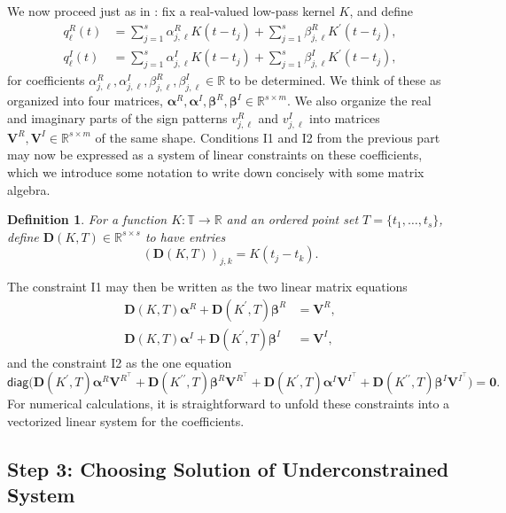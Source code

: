 \documentclass[11pt]{article}
\newcommand{\RR}{\mathbb{R}}
\newcommand{\TT}{\mathbb{T}}
\newcommand{\diag}{\mathsf{diag}}
\newcommand{\balpha}{\bm \alpha}
\newcommand{\bbeta}{\bm \beta}
\newcommand{\bD}{\bm D}
\newcommand{\bV}{\bm V}
\newtheorem{definition}{Definition}
\begin{document}
We now proceed just as in \cite{fernandez2016super}: fix a real-valued low-pass kernel $K$, and define
\begin{align}
  q_\ell^R(t) &= \sum_{j = 1}^s \alpha_{j, \ell}^R K(t - t_j) + \sum_{j = 1}^s \beta_{j, \ell}^R K^\prime(t - t_j), \label{eq:interpolant-def-1} \\
  q_\ell^I(t) &= \sum_{j = 1}^s \alpha_{j, \ell}^I K(t - t_j) + \sum_{j = 1}^s \beta_{j, \ell}^I K^\prime(t - t_j), \label{eq:interpolant-def-2}
\end{align}
for coefficients $\alpha_{j, \ell}^R, \alpha_{j, \ell}^I, \beta_{j, \ell}^R, \beta_{j, \ell}^I \in \RR$ to be determined.
We think of these as organized into four matrices, $\balpha^R, \balpha^I, \bbeta^R, \bbeta^I \in \RR^{s \times m}$.
We also organize the real and imaginary parts of the sign patterns $v_{j, \ell}^R$ and $v_{j, \ell}^I$ into matrices $\bV^R, \bV^I \in \RR^{s \times m}$ of the same shape.
Conditions I1 and I2 from the previous part may now be expressed as a system of linear constraints on these coefficients, which we introduce some notation to write down concisely with some matrix algebra.
\begin{definition}
    For a function $K: \TT \to \RR$ and an ordered point set $T = \{t_1, \dots, t_s\}$, define $\bD(K, T) \in \RR^{s \times s}$ to have entries
    \begin{equation}
        (\bD(K, T))_{j, k} = K(t_j - t_k).
    \end{equation}
\end{definition}
The constraint I1 may then be written as the two linear matrix equations
\begin{align}
  \bD(K, T)\balpha^R + \bD(K^\prime, T)\bbeta^R &= \bV^R, \label{1045} \\
  \bD(K, T)\balpha^I + \bD(K^\prime, T)\bbeta^I &= \bV^I, \label{1046}
\end{align}
and the constraint I2 as the one equation
\begin{equation}
    \diag\bigg(\bD(K^{\prime}, T)\balpha^R\bV^{R^\top} + \bD(K^{\prime\prime}, T)\bbeta^R\bV^{R^\top} + \bD(K^{\prime}, T)\balpha^I\bV^{I^\top} + \bD(K^{\prime\prime}, T)\bbeta^I\bV^{I^\top}\bigg) = \bm 0. \label{1047}
\end{equation}
For numerical calculations, it is straightforward to unfold these constraints into a vectorized linear system for the coefficients.

\subsection{Step 3: Choosing Solution of Underconstrained System}
\end{document}
